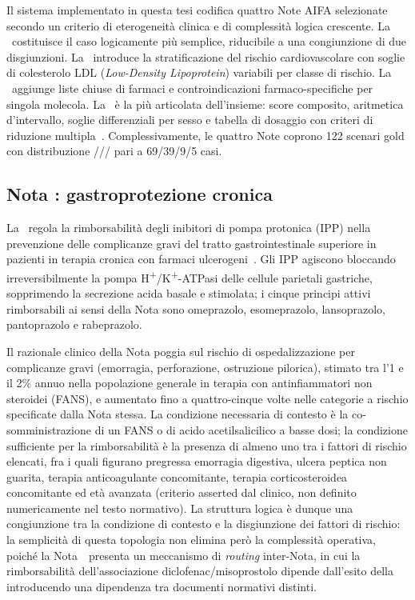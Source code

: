 Il sistema implementato in questa tesi codifica quattro Note AIFA selezionate
secondo un criterio di eterogeneità clinica e di complessità logica crescente.
La \notezero\ costituisce il caso logicamente più semplice, riducibile a una
congiunzione di due disgiunzioni.
La \notetredici\ introduce la stratificazione del rischio cardiovascolare con
soglie di colesterolo LDL (\emph{Low-Density Lipoprotein}) variabili per classe di rischio.
La \notesessanta\ aggiunge liste chiuse di farmaci e controindicazioni
farmaco-specifiche per singola molecola.
La \notenova\ è la più articolata dell'insieme: score composito, aritmetica
d'intervallo, soglie differenziali per sesso e tabella di dosaggio con criteri
di riduzione multipla~\cite{aifa2024note}.
Complessivamente, le quattro Note coprono 122 scenari gold con distribuzione
///
pari a 69/39/9/5 casi.

\subsection{Nota \notezero: gastroprotezione cronica}
\label{subsec:nota01}

La \notezero\ regola la rimborsabilità degli inibitori di pompa protonica (IPP)
nella prevenzione delle complicanze gravi del tratto gastrointestinale superiore
in pazienti in terapia cronica con farmaci ulcerogeni~\cite{nota01aifa}.
Gli IPP agiscono bloccando irreversibilmente la pompa
H\textsuperscript{+}/K\textsuperscript{+}-ATPasi delle cellule parietali gastriche,
sopprimendo la secrezione acida basale e stimolata; i cinque principi attivi
rimborsabili ai sensi della Nota sono omeprazolo, esomeprazolo, lansoprazolo,
pantoprazolo e rabeprazolo.

Il razionale clinico della Nota poggia sul rischio di ospedalizzazione per
complicanze gravi (emorragia, perforazione, ostruzione pilorica), stimato tra
l'1 e il 2\% annuo nella popolazione generale in terapia con antinfiammatori non steroidei (FANS), e aumentato
fino a quattro-cinque volte nelle categorie a rischio specificate dalla Nota stessa.
La condizione necessaria di contesto è la co-somministrazione di un FANS o di
acido acetilsalicilico a basse dosi; la condizione sufficiente per la rimborsabilità
è la presenza di almeno uno tra i fattori di rischio elencati, fra i quali figurano
pregressa emorragia digestiva, ulcera peptica non guarita, terapia anticoagulante
concomitante, terapia corticosteroidea concomitante ed età avanzata (criterio
asserted dal clinico, non definito numericamente nel testo normativo).
La struttura logica è dunque una congiunzione tra la condizione di contesto e
la disgiunzione dei fattori di rischio: la semplicità di questa topologia non
elimina però la complessità operativa, poiché la Nota~\notezero\ presenta un
meccanismo di \emph{routing} inter-Nota, in cui la rimborsabilità dell'associazione
diclofenac/misoprostolo dipende dall'esito della \notesessanta\, introducendo
una dipendenza tra documenti normativi distinti.

